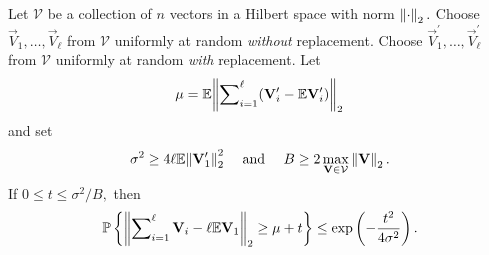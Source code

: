 \begin{lemma}
 \label{chprelim:lem:vector-bernstein}
  Let $\mathcal{V}$ be a collection of $n$ vectors in a Hilbert space with norm
  $\left\|\cdot\right\|_2.$ Choose $\vec{V}_1, \ldots, \vec{V}_\ell$ from $\mathcal{V}$ 
  uniformly at random \emph{without} replacement. Choose 
  $\vec{V}_1^\prime, \ldots, \vec{V}_\ell^\prime$ from $\mathcal{V}$ uniformly at
  random \emph{with} replacement. Let
\[
 \mu = \mathbb{E}{\left\|\sum\nolimits_{i=1}^\ell (\mathbf{V}_i^\prime - \mathbb{E}{\mathbf{V}_i^\prime})\right\|_2}
\]
and set
\[
\sigma^2 \geq 4\ell\mathbb{E}{\left\|\mathbf{V}_1^\prime\right\|_2^2} \quad \text{ and } 
\quad B \geq 2 \max_{\mathbf{V} \in \mathcal{V}} \left\|\mathbf{V}\right\|_2.
\]
If $ 0 \leq t \leq \sigma^2/B,$ then
\[
 \mathbb{P}\left\{\left\|\sum\nolimits_{i=1}^\ell \mathbf{V}_i - \ell\mathbb{E}{\mathbf{V}_1}\right\|_2 \geq 
 \mu+t\right\} \leq \mathrm{exp}\left( -\frac{t^2}{4 \sigma^2} \right).
\]
\end{lemma}

